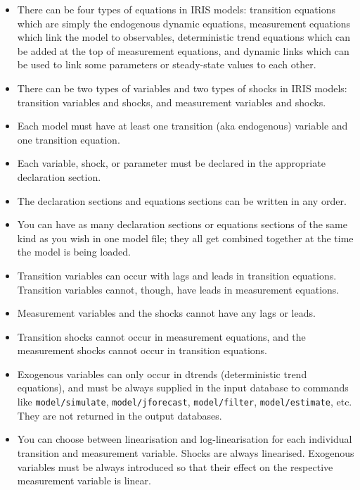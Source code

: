  \begin{itemize}
 \item
   There can be four types of equations in IRIS models: transition
   equations which are simply the endogenous dynamic equations,
   measurement equations which link the model to observables,
   deterministic trend equations which can be added at the top of
   measurement equations, and dynamic links which can be used to link
   some parameters or steady-state values to each other.
 \item
   There can be two types of variables and two types of shocks in IRIS
   models: transition variables and shocks, and measurement variables and
   shocks.
 \item
   Each model must have at least one transition (aka endogenous) variable
   and one transition equation.
 \item
   Each variable, shock, or parameter must be declared in the appropriate
   declaration section.
 \item
   The declaration sections and equations sections can be written in any
   order.
 \item
   You can have as many declaration sections or equations sections of the
   same kind as you wish in one model file; they all get combined
   together at the time the model is being loaded.
 \item
   Transition variables can occur with lags and leads in transition
   equations. Transition variables cannot, though, have leads in
   measurement equations.
 \item
   Measurement variables and the shocks cannot have any lags or leads.
 \item
   Transition shocks cannot occur in measurement equations, and the
   measurement shocks cannot occur in transition equations.
 \item
   Exogenous variables can only occur in dtrends (deterministic trend
   equations), and must be always supplied in the input database to
   commands like \texttt{model/simulate}, \texttt{model/jforecast},
   \texttt{model/filter}, \texttt{model/estimate}, etc. They are not
   returned in the output databases.
 \item
   You can choose between linearisation and log-linearisation for each
   individual transition and measurement variable. Shocks are always
   linearised. Exogenous variables must be always introduced so that
   their effect on the respective measurement variable is linear.
 \end{itemize}



